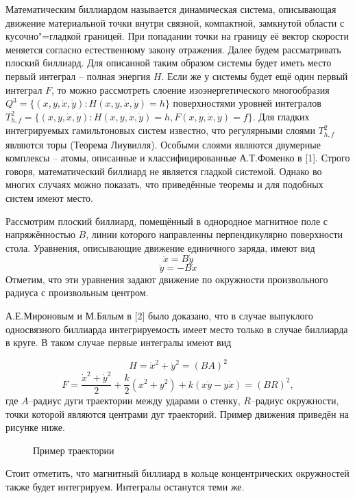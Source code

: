 \vzmscaption

	Математическим биллиардом называется динамическая система, описывающая движение материальной точки внутри связной, компактной, замкнутой области с кусочно"=гладкой границей. При попадании точки на границу её вектор скорости меняется согласно естественному закону отражения. Далее будем рассматривать плоский биллиард. Для описанной таким образом системы будет иметь место первый интеграл -- полная энергия $H$. Если же у системы будет ещё один первый интеграл $F$, то можно рассмотреть слоение изоэнергетического многообразия $Q^3=\{(x,y,\dot{x}, \dot{y}): H(x,y,\dot{x}, \dot{y})=h\}$ поверхностями уровней интегралов $T^2_{h,f}=\{(x,y,\dot{x}, \dot{y}): H(x,y,\dot{x}, \dot{y})=h, F(x,y,\dot{x}, \dot{y})=f\}$. Для гладких интегрируемых гамильтоновых систем известно, что регулярными слоями $T^2_{h,f}$ являются торы (Теорема Лиувилля). Особыми слоями являются двумерные комплексы -- атомы, описанные и классифицированные А.Т.Фоменко в [1]. Строго говоря, математический биллиард не является гладкой системой. Однако во многих случаях можно показать, что приведённые теоремы и для подобных систем имеют место.

	Рассмотрим плоский биллиард, помещённый в однородное магнитное поле с напряжённостью $B$, линии которого направленны перпендикулярно поверхности стола. Уравнения, описывающие движение единичного заряда, имеют вид
	$$
	\ddot{x} =B\dot{y}
	$$
	$$
	\ddot{y} =-B\dot{x}
	$$
	Отметим, что эти уравнения задают движение по окружности произвольного радиуса с произвольным центром.

	А.Е.Мироновым и М.Бялым в [2] было доказано, что в случае выпуклого односвязного биллиарда интегрируемость имеет место только в случае биллиарда в круге. В таком случае первые интегралы имеют вид

	$$
	H=\dot{x}^2+\dot{y}^2=(BA)^2
	$$
	$$
	F=\frac{\dot{x}^2+\dot{y}^2}{2}+\frac{k}{2}(x^2+y^2)+k(x\dot{y}-y\dot{x})=(BR)^2,
	$$
	где $A$--радиус дуги траектории между ударами о стенку, $R$--радиус окружности, точки которой являются центрами дуг траекторий. Пример движения приведён на рисунке ниже.

	\begin{figure}[h!]
		\center{\texttt{[image: ex2]}}
		\caption{Пример траектории}
	\end{figure}
	Стоит отметить, что магнитный биллиард в кольце концентрических окружностей также будет интегрируем. Интегралы останутся теми же.


